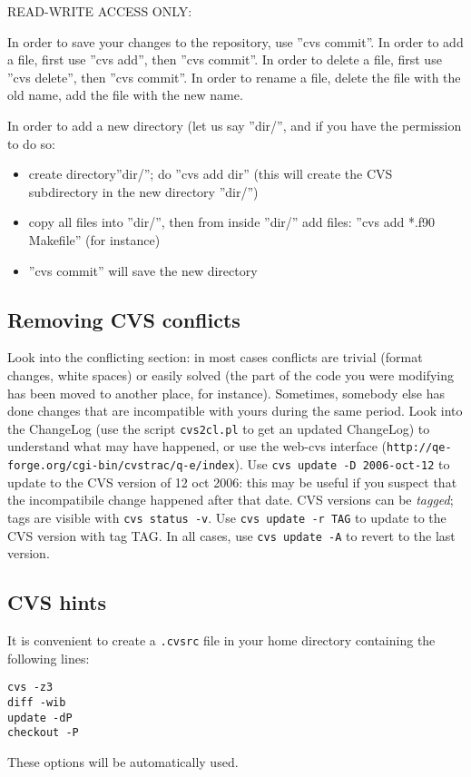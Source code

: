 \documentclass[12pt,a4paper]{article}
\begin{document}
READ-WRITE ACCESS ONLY:

In order to save your changes to the repository, use ''cvs
commit''. In order to add a file, first use ''cvs add'', then ''cvs
commit''. In order to delete a file, first use ''cvs delete'', then
''cvs commit''. In order to rename a file, delete the file with the
old name, add the file with the new name. 

In order to add a new directory (let us say ''dir/'', and if you have
the permission to do so: 
\begin{itemize}
\item create directory''dir/''; do ''cvs add dir'' (this will create
  the CVS subdirectory in the new directory ''dir/'') 
\item copy all files into ''dir/'', then from inside ''dir/'' add
  files: ''cvs add *.f90 Makefile'' (for instance) 
\item ''cvs commit'' will save the new directory
\end{itemize}

\subsection{Removing CVS conflicts}
\label{SubSec:Conflicts}
  Look into the conflicting section: in
  most cases conflicts are trivial (format changes, white spaces) or
  easily solved (the part of the code you were modifying has been
  moved to another place, for instance). Sometimes, somebody else has
  done changes that are incompatible with yours during the same
  period. Look into the ChangeLog (use the script \texttt{cvs2cl.pl}
  to get an updated ChangeLog) to understand what may have happened,
  or use the web-cvs interface
  (\texttt{http://qe-forge.org/cgi-bin/cvstrac/q-e/index}).
  Use \texttt{cvs update -D 2006-oct-12} to update to the CVS version 
  of 12 oct 2006: this may be useful if you suspect that the incompatibile 
  change happened after that date. CVS versions can be {\em tagged}; 
  tags are visible with \texttt{cvs status -v}. Use \texttt{cvs update -r TAG}
  to update to the CVS version with tag TAG. In all cases, use 
  \texttt{cvs update -A} to revert to the last version.

\subsection{CVS hints}
\label{SubSec:CVShints}
It is convenient to create a \texttt{.cvsrc} file in your
home directory containing the following lines:
\begin{verbatim}
cvs -z3
diff -wib
update -dP
checkout -P
\end{verbatim}
These options will be automatically used.
\end{document}
